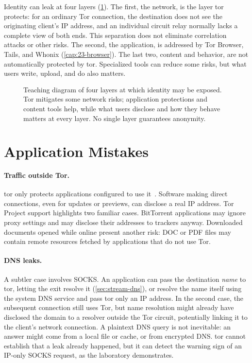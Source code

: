 Identity can leak at four layers (\cref{fig:livelli}). The first, the network, is the layer tor protects: for an ordinary Tor connection, the destination does not see the originating client's IP address, and an individual circuit relay normally lacks a complete view of both ends. This separation does not eliminate correlation attacks or other risks. The second, the application, is addressed by Tor Browser, Tails, and Whonix (\cref{cap:23-browser}). The last two, content and behavior, are not automatically protected by tor. Specialized tools can reduce some risks, but what users write, upload, and do also matters.

\begin{figure}[htbp]
\centering

\caption{Teaching diagram of four layers at which identity may be exposed. Tor mitigates some network risks; application protections and content tools help, while what users disclose and how they behave matters at every layer. No single layer guarantees anonymity.}
\label{fig:livelli}
\end{figure}

\section{Application Mistakes}\label{sec:opsec-applicazione}

\paragraph{Traffic outside Tor.} tor only protects applications configured to use it~\cite{torsafety}. Software making direct connections, even for updates or previews, can disclose a real IP address. Tor Project support highlights two familiar cases. BitTorrent applications may ignore proxy settings and may disclose their addresses to trackers anyway. Downloaded documents opened while online present another risk: DOC or PDF files may contain remote resources fetched by applications that do not use Tor.

\paragraph{DNS leaks.} A subtler case involves SOCKS. An application can pass the destination \emph{name} to tor, letting the exit resolve it (\cref{sec:stream-dns}), or resolve the name itself using the system DNS service and pass tor only an IP address. In the second case, the subsequent connection still uses Tor, but name resolution might already have disclosed the domain to a resolver outside the Tor circuit, potentially linking it to the client's network connection. A plaintext DNS query is not inevitable: an answer might come from a local file or cache, or from encrypted DNS. tor cannot establish that a leak already happened, but it can detect the warning sign of an IP-only SOCKS request, as the laboratory demonstrates.

